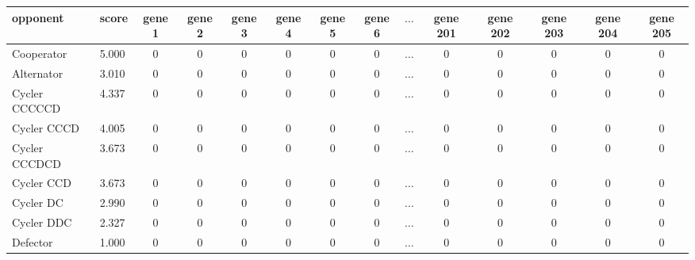 \begin{tabular}{llcccccccccccc}
\toprule
     opponent &  score &  gene 1 &  gene 2 &  gene 3 &  gene 4 &  gene 5 &  gene 6 &  \(\dots\) & gene 201 &  gene 202 &  gene 203 &  gene 204 &  gene 205 \\
\midrule
   Cooperator &  5.000 &       0 &       0 &       0 &       0 &    0 &       0 &  \(\dots\) &        0 &         0 &         0 &         0 &         0 \\
   Alternator &  3.010 &       0 &       0 &       0 &       0 &    0 &       0 &  \(\dots\) &        0 &         0 &         0 &         0 &         0 \\
Cycler CCCCCD &  4.337 &       0 &       0 &       0 &       0 &    0 &       0 &  \(\dots\) &        0 &         0 &         0 &         0 &         0 \\
  Cycler CCCD &  4.005 &       0 &       0 &       0 &       0 &    0 &       0 &  \(\dots\) &        0 &         0 &         0 &         0 &         0 \\
Cycler CCCDCD &  3.673 &       0 &       0 &       0 &       0 &    0 &       0 &  \(\dots\) &        0 &         0 &         0 &         0 &         0 \\
   Cycler CCD &  3.673 &       0 &       0 &       0 &       0 &    0 &       0 &  \(\dots\) &        0 &         0 &         0 &         0 &         0 \\
    Cycler DC &  2.990 &       0 &       0 &       0 &       0 &    0 &       0 &  \(\dots\) &        0 &         0 &         0 &         0 &         0 \\
   Cycler DDC &  2.327 &       0 &       0 &       0 &       0 &    0 &       0 &  \(\dots\) &        0 &         0 &         0 &         0 &         0 \\
     Defector &  1.000 &       0 &       0 &       0 &       0 &    0 &       0 &  \(\dots\) &        0 &         0 &         0 &         0 &         0 \\
\bottomrule
\end{tabular}
